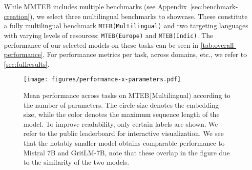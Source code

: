 While MMTEB includes multiple benchmarks (see Appendix~\ref{sec:benchmark-creation}), we select three multilingual benchmarks to showcase. These constitute a fully multilingual benchmark \texttt{MTEB(Multilingual)} and two targeting languages with varying levels of resources: \texttt{MTEB(Europe)} and \texttt{MTEB(Indic)}. The performance of our selected models on these tasks can be seen in \autoref{tab:overall-performance}.
For performance metrics per task, across domains, etc., we refer to \autoref{sec:fullresults}. 
\begin{figure}
    \centering
    \texttt{[image: figures/performance-x-parameters.pdf]}
\caption{Mean performance across tasks on MTEB(Multilingual) according to the number of parameters. The circle size denotes the embedding size, while the color denotes the maximum sequence length of the model. To improve readability, only certain labels are shown. We refer to the public leaderboard
for interactive visualization. We see that the notably smaller model obtains comparable performance to Mistral 7B and GritLM-7B, note that these overlap in the figure due to the similarity of the two models.}
    \label{fig:performance-x-speed}
    \vspace{-3mm}
\end{figure}



